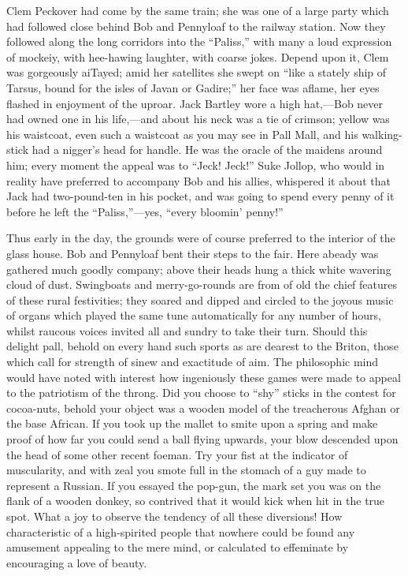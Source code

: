 Clem Peckover had come by the same train; she was one of a large party
which had followed close behind Bob and Pennyloaf to the railway
station. Now they followed along the long corridors into the ``Paliss,''
with many a loud expression of mockeiy, with hee-hawing laughter, with
coarse jokes. Depend upon it, Clem was gorgeously aiTayed; amid her
satellites she swept on ``like a stately ship of Tarsus, bound for the
isles of Javan or Gadire;'' her face was aflame, her eyes flashed in
enjoyment of the {}uproar. Jack Bartley wore a high hat,---Bob never had
owned one in his life,---and about his neck was a tie of crimson; yellow
was his waistcoat, even such a waistcoat as you may see in Pall Mall,
and his walking-stick had a nigger's head for handle. He was the oracle
of the maidens around him; every moment the appeal was to ``Jeck!
Jeck!'' Suke Jollop, who would in reality have preferred to accompany
Bob and his allies, whispered it about that Jack had two-pound-ten in
his pocket, and was going to spend every penny of it before he left the
``Paliss,''---yes, ``every bloomin' penny!''

Thus early in the day, the grounds were of course preferred to the
interior of the glass house. Bob and Pennyloaf bent their steps to the
fair. Here abeady was gathered much goodly company; above their heads
hung a thick white wavering cloud of dust. Swingboats and
merry-go-rounds are from of old the chief features of these rural
festivities; they soared and dipped and circled to the joyous music of
organs which played the {}same tune automatically for any number of
hours, whilst raucous voices invited all and sundry to take their turn.
Should this delight pall, behold on every hand such sports as are
dearest to the Briton, those which call for strength of sinew and
exactitude of aim. The philosophic mind would have noted with interest
how ingeniously these games were made to appeal to the patriotism of the
throng. Did you choose to ``shy'' sticks in the contest for cocoa-nuts,
behold your object was a wooden model of the treacherous Afghan or the
base African. If you took up the mallet to smite upon a spring and make
proof of how far you could send a ball flying upwards, your blow
descended upon the head of some other recent foeman. Try your fist at
the indicator of muscularity, and with zeal you smote full in the
stomach of a guy made to represent a Russian. If you essayed the
pop-gun, the mark set you was on the flank of a wooden donkey, so
contrived that it would kick when hit in the true spot. What a joy to
observe the {}tendency of all these diversions! How characteristic of a
high-spirited people that nowhere could be found any amusement appealing
to the mere mind, or calculated to effeminate by encouraging a love of
beauty.


